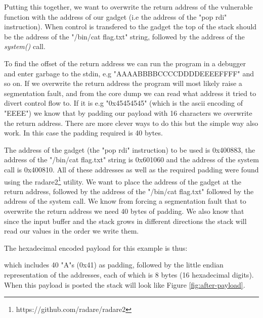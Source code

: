 Putting this together, we want to overwrite the return address of the vulnerable function
with the address of our gadget (i.e the address of the "pop rdi" instruction). When control
is transfered to the gadget the top of the stack should be the address of the "/bin/cat flag.txt"
string, followed by the address of the \textit{system()} call.

To find the offset of the return address we can run the program in a debugger and enter
garbage to the stdin, e.g "AAAABBBBCCCCDDDDEEEEFFFF" and so on. If we overwrite the return
address the program will most likely raise a segmentation fault, and from the core dump we
can read what address it tried to divert control flow to. If it is e.g "0x45454545" (which
is the ascii encoding of "EEEE") we know that by padding our payload with 16 characters we
overwrite the return address. There are more clever ways to do this but the simple way
also work. In this case the padding required is 40 bytes.

The address of the gadget (the "pop rdi" instruction) to be used is 0x400883, the address
of the "/bin/cat flag.txt" string is 0x601060 and the address of the system call is
0x400810. All of these addresses as well as the required padding were found using the
radare2\footnote{https://github.com/radare/radare2} utility. We want to place the address
of the gadget at the return address, followed by the address of the "/bin/cat flag.txt"
followed by the address of the system call. We know from forcing a segmentation fault that
to overwrite the return address we need 40 bytes of padding. We also know that since the
input buffer and the stack grows in different directions the stack will read our values in
the order we write them.

The hexadecimal encoded payload for this example is thus:


which includes 40 "A"s (0x41) as padding, followed by the little endian
representation of the addresses, each of which is 8 bytes (16 hexadecimal digits). When
this payload is posted the stack will look like Figure \ref{fig:after-payload}.


